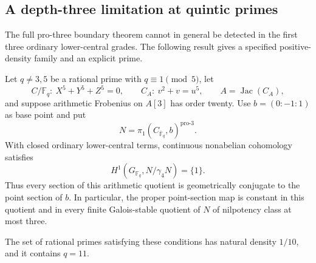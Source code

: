 \subsection{A depth-three limitation at quintic primes}
\label{subsec:ff3-quintic-depth-three}

The full pro-three boundary theorem cannot in general be detected
in the first three ordinary lower-central grades.  The following
result gives a specified positive-density family and an explicit prime.

\begin{proposition}
\label{prop:ff3-quintic-depth-three}
Let $q\ne3,5$ be a rational prime with $q\equiv1\pmod5$, let
\[
 C/\mathbb F_q:\ X^5+Y^5+Z^5=0,\qquad
 C_A:\ v^2+v=u^5,\qquad A=\operatorname{Jac}(C_A),
\]
and suppose arithmetic Frobenius on $A[3]$ has order twenty.
Use $b=(0:-1:1)$ as base point and put
\[
 N=\pi_1(C_{\overline{\mathbb F}_q},b)^{\mathrm{pro}\text{-}3}.
\]
With closed ordinary lower-central terms, continuous nonabelian
cohomology satisfies
\[
 H^1(G_{\mathbb F_q},N/\gamma_4N)=\{1\}.
\]
Thus every section of this arithmetic quotient is geometrically
conjugate to the point section of $b$.  In particular, the proper
point-section map is constant in this quotient and in every finite
Galois-stable quotient of $N$ of nilpotency class at most three.

The set of rational primes satisfying these conditions has natural
density $1/10$, and it contains $q=11$.
\end{proposition}

